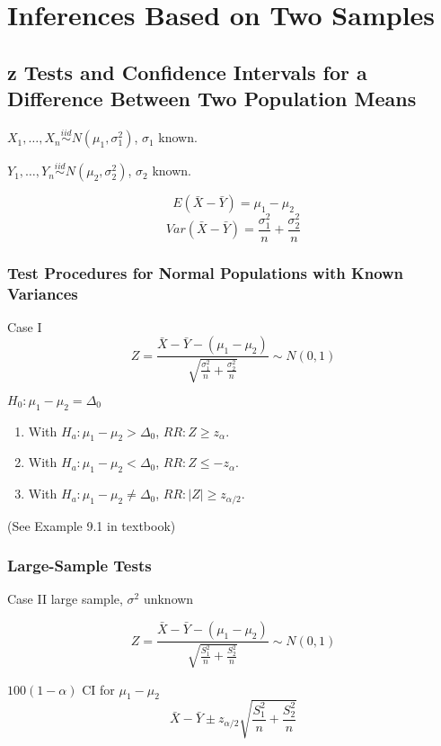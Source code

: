 \chapter{Inferences Based on Two Samples}
\section{z Tests and Confidence Intervals for a Difference Between Two Population Means}

$X_1,\dots,X_n \overset{iid}{\sim} N(\mu_1,\sigma_1^2)$, $\sigma_1$ known.

$Y_1,\dots,Y_n \overset{iid}{\sim} N(\mu_2,\sigma_2^2)$, $\sigma_2$ known.

\begin{prop}
\[E(\bar{X}-\bar{Y})=\mu_1-\mu_2\]
\[Var(\bar{X}-\bar{Y})=\frac{\sigma_1^2}{n}+\frac{\sigma_2^2}{n}\]
\end{prop}

\subsection{Test Procedures for Normal Populations with Known Variances}
Case I
\[Z=\frac{\bar{X}-\bar{Y}-(\mu_1-\mu_2)}{\sqrt{\frac{\sigma_1^2}{n}+\frac{\sigma_2^2}{n}}} \sim N(0,1)\]

$H_0:\mu_1-\mu_2=\Delta_0$
\begin{enumerate}
\item With $H_a: \mu_1-\mu_2>\Delta_0$, $RR:Z\geq z_{\alpha}$.
\item With $H_a: \mu_1-\mu_2<\Delta_0$, $RR:Z\leq -z_{\alpha}$.
\item With $H_a: \mu_1-\mu_2\neq\Delta_0$, $RR:|Z|\geq z_{\alpha/2}$.
\end{enumerate}

\begin{exmp}
(See Example 9.1 in textbook)
\end{exmp}

\subsection{Large-Sample Tests}
Case II large sample, $\sigma^2$ unknown

\[Z=\frac{\bar{X}-\bar{Y}-(\mu_1-\mu_2)}{\sqrt{\frac{S_1^2}{n}+\frac{S_2^2}{n}}} \sim N(0,1)\]

$100(1-\alpha)$ CI for $\mu_1-\mu_2$
\[ \bar{X}-\bar{Y} \pm z_{\alpha/2} \sqrt{\frac{S_1^2}{n}+\frac{S_2^2}{n}} \]


